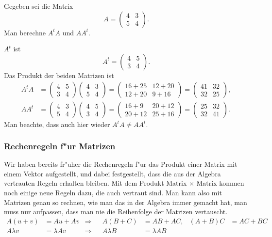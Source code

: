 \begin{beispiel}
Gegeben sei die Matrix
\[
A=\begin{pmatrix}
4&3\\
5&4
\end{pmatrix}.
\]
Man berechne $A^tA$ und $AA^t$.

\smallskip

{\parindent 0pt $A^t$ ist}
\[
A^t=\begin{pmatrix}
4&5\\
3&4
\end{pmatrix}.
\]
Das Produkt der beiden Matrizen ist
\begin{align*}
A^tA&=
\begin{pmatrix}
4&5\\
3&4
\end{pmatrix}
\begin{pmatrix}
4&3\\
5&4
\end{pmatrix}
=\begin{pmatrix}
16+25&12+20\\
12+20&9+16
\end{pmatrix}
=
\begin{pmatrix}
41&32\\
32&25
\end{pmatrix},
\\
AA^t&=
\begin{pmatrix}
4&3\\
5&4
\end{pmatrix}
\begin{pmatrix}
4&5\\
3&4
\end{pmatrix}
=
\begin{pmatrix}
16+9&20+12\\
20+12&25+16
\end{pmatrix}
=
\begin{pmatrix}
25&32\\
32&41
\end{pmatrix}.
\end{align*}
Man beachte, dass auch hier wieder $A^tA\ne AA^t$.
\end{beispiel}

\subsubsection{Rechenregeln f"ur Matrizen}
Wir haben bereits fr"uher die Rechenregeln f"ur das Produkt einer Matrix
mit einem Vektor aufgestellt, und dabei festgestellt, dass die
aus der Algebra vertrauten Regeln erhalten bleiben.
Mit dem
Produkt Matrix $\times$ Matrix kommen noch einige neue Regeln dazu,
die auch vertraut sind.
Man kann also mit Matrizen genau so rechnen,
wie man das in der Algebra immer gemacht hat, man muss nur
aufpassen, dass man nie die Reihenfolge der Matrizen vertauscht.
\begin{align*}
    A(u+v)&=Au+Av     &\Rightarrow&&A(B+C)&=AB+AC,    &(A+B)C&=AC+BC\\
A\lambda v&=\lambda Av&\Rightarrow&&A\lambda B&=\lambda AB
\end{align*}


